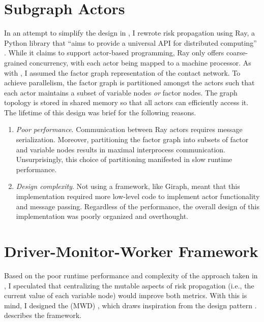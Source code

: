 \section{Subgraph Actors}\label{sec:subgraph-actors}

In an attempt to simplify the design in , I rewrote risk propagation using Ray, a Python library that ``aims to provide a universal API for distributed computing'' \cite{RayArchitecture}. While it claims to support actor-based programming, Ray only offers coarse-grained concurrency, with each actor being mapped to a machine processor. As with , I assumed the factor graph representation of the contact network. To achieve parallelism, the factor graph is partitioned amongst the actors such that each actor maintains a subset of variable nodes \emph{or} factor nodes. The graph topology is stored in shared memory so that all actors can efficiently access it. The lifetime of this design was brief for the following reasons.

\begin{enumerate}
\item \emph{Poor performance}. Communication between Ray actors requires message serialization. Moreover, partitioning the factor graph into subsets of factor and variable nodes results in maximal interprocess communication. Unsurprisingly, this choice of partitioning manifested in slow runtime performance.
\item \emph{Design complexity}. Not using a framework, like Giraph, meant that this implementation required more low-level code to implement actor functionality and message passing. Regardless of the performance, the overall design of this implementation was poorly organized and overthought.
\end{enumerate}

\section{Driver-Monitor-Worker Framework}\label{sec:mwd-framework}

Based on the poor runtime performance and complexity of the approach taken in , I speculated that centralizing the mutable aspects of risk propagation (i.e., the current value of each variable node) would improve both metrics. With this is mind, I designed the  (MWD) , which draws inspiration from the  design pattern \cite{RayTreeOfActors}.  describes the framework.

